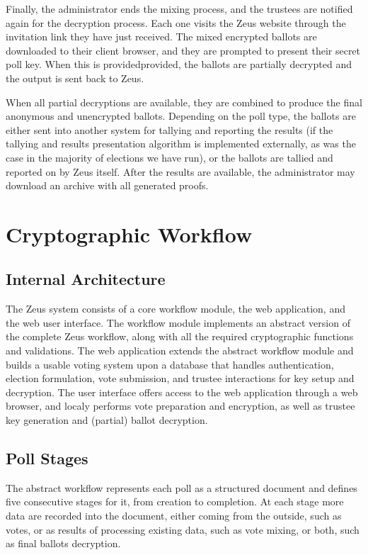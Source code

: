 \documentclass[letterpaper,10pt]{article}
\begin{document}
Finally, the administrator ends the mixing process,
and the trustees are notified again for the decryption process.
Each one visits the Zeus website through the invitation link they have
just received.
The mixed encrypted ballots are downloaded to their client browser,
and they are prompted to present their secret poll key.
When this is providedprovided, the ballots are partially decrypted 
and the output is sent back to Zeus.

When all partial decryptions are available, they are combined to produce
the final anonymous and unencrypted ballots.
Depending on the poll type, the ballots are either sent into another
system for tallying and reporting the results (if the tallying
and results presentation algorithm is implemented externally, as was
the case in the majority of elections we have run),
or the ballots are tallied and reported on by Zeus itself.
After the results are available,
the administrator may download an archive with all generated proofs.

\section{Cryptographic Workflow}
\label{sec:crypto_workflow}

\subsection{Internal Architecture}
The Zeus system consists of a core workflow module, the web application,
and the web user interface.
The workflow module implements an abstract version of the complete Zeus
workflow, along with all the required cryptographic functions and
validations. The web application extends the abstract workflow module
and builds a usable voting system upon a database
that handles authentication, election formulation, vote submission,
and trustee interactions for key setup and decryption.
The user interface offers access to the web application through
a web browser, and localy performs vote preparation and encryption,
as well as trustee key generation and (partial) ballot decryption.

\subsection{Poll Stages}
The abstract workflow represents each poll as a structured document
and defines five consecutive stages for it, from creation to completion.
At each stage more data are recorded into the document,
either coming from the outside, such as votes,
or as results of processing existing data, such as vote mixing,
or both, such as final ballots decryption.
\end{document}

